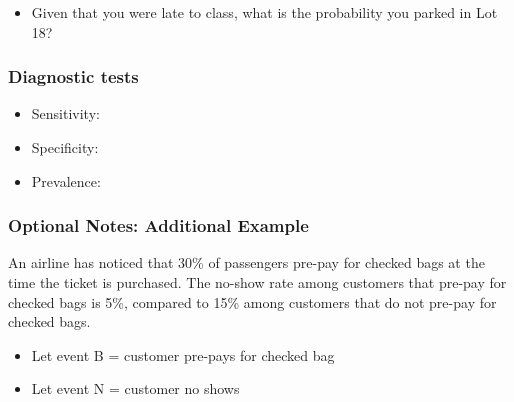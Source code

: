 \documentclass[
]{report}
\providecommand{\tightlist}{%
  \setlength{\itemsep}{0pt}\setlength{\parskip}{0pt}}
\begin{document}
\vspace{1in}

\begin{itemize}
\tightlist
\item
  Given that you were late to class, what is the probability you parked in Lot 18?
\end{itemize}

\vspace{1in}

\subsubsection*{Diagnostic tests}\label{diagnostic-tests}

\begin{itemize}
\tightlist
\item
  Sensitivity:
\end{itemize}

\vspace{0.3in}

\begin{itemize}
\tightlist
\item
  Specificity:
\end{itemize}

\vspace{0.3in}

\begin{itemize}
\tightlist
\item
  Prevalence:
\end{itemize}

\vspace{0.3in}

\subsubsection*{Optional Notes: Additional Example}\label{optional-notes-additional-example-1}

An airline has noticed that 30\% of passengers pre-pay for checked bags at the time the ticket is purchased. The no-show rate among customers that pre-pay for checked bags is 5\%, compared to 15\% among customers that do not pre-pay for checked bags.

\begin{itemize}
\tightlist
\item
  Let event B = customer pre-pays for checked bag
\item
  Let event N = customer no shows
\end{itemize}
\end{document}
